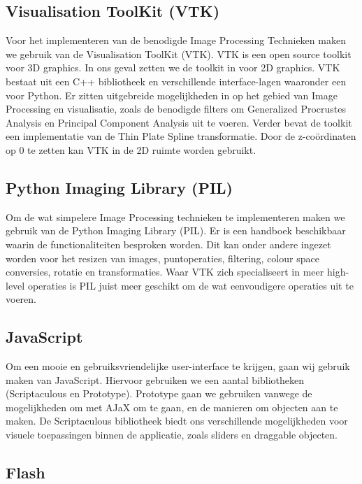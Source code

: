 \subsection{Visualisation ToolKit (VTK)}
Voor het implementeren van de benodigde Image Processing Technieken maken we gebruik van de Visualisation ToolKit (VTK)\cite{vtk}.
VTK is een open source toolkit voor 3D graphics.
In ons geval zetten we de toolkit in voor 2D graphics.
VTK bestaat uit een C++ bibliotheek en verschillende interface-lagen waaronder een voor Python.\cite{vtk2}
Er zitten uitgebreide mogelijkheden in op het gebied van Image Processing en visualisatie, zoals de benodigde filters om Generalized Procrustes Analysis en Principal Component Analysis uit te voeren.
Verder bevat de toolkit een implementatie van de Thin Plate Spline transformatie.
Door de z-co\"{o}rdinaten op 0 te zetten kan VTK in de 2D ruimte worden gebruikt.

\subsection{Python Imaging Library (PIL)}
Om de wat simpelere Image Processing technieken te implementeren maken we gebruik van de Python Imaging Library (PIL)\cite{pil}.
Er is een handboek beschikbaar waarin de functionaliteiten besproken worden.\cite{pilhandbook}
Dit kan onder andere ingezet worden voor het resizen van images, puntoperaties, filtering, colour space conversies, rotatie en transformaties. Waar VTK zich specialiseert in meer high-level operaties is PIL juist meer geschikt om de wat eenvoudigere operaties uit te voeren.

\subsection{JavaScript}
Om een mooie en gebruiksvriendelijke user-interface te krijgen, gaan wij gebruik maken van JavaScript.
Hiervoor gebruiken we een aantal bibliotheken (Scriptaculous\cite{scriptaculous} en Prototype\cite{prototype}).
Prototype gaan we gebruiken vanwege de mogelijkheden om met AJaX om te gaan, en de manieren om objecten aan te maken.
De Scriptaculous bibliotheek biedt ons verschillende mogelijkheden voor visuele toepassingen binnen de applicatie, zoals sliders en draggable objecten.

\subsection{Flash}
